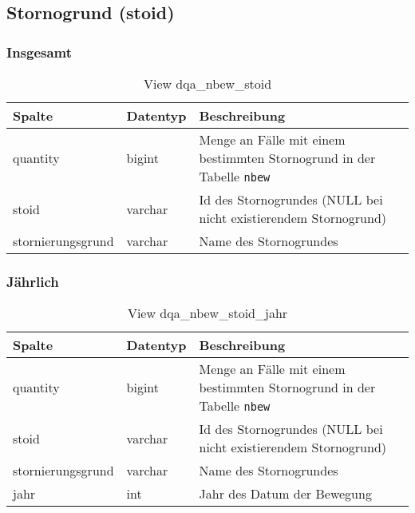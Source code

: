 \subsection{Stornogrund (stoid)} \label{subsec:bewStoid}

\subsubsection{Insgesamt} \label{subsubsec:bewStoidI}

\begin{table}[ht]
	\centering   
	\caption{View dqa\_nbew\_stoid}
	\label{tab:bewStoidI}
	\begin{tabular}{||l|l|p{10cm}||}   		
		\hline
		Spalte & Datentyp & Beschreibung \\ [0.5ex]
		\hline\hline
		quantity & bigint & Menge an Fälle mit einem bestimmten Stornogrund in der Tabelle \texttt{nbew} \\
		\hline
		stoid & varchar & Id des Stornogrundes (NULL bei nicht existierendem Stornogrund)\\
		\hline
		stornierungsgrund & varchar & Name des Stornogrundes \\
		\hline
	\end{tabular}
\end{table}

\newpage

\subsubsection{Jährlich} \label{subsubsec:bewStoidJ}

\begin{table}[ht]
	\centering   
	\caption{View dqa\_nbew\_stoid\_jahr}
	\label{tab:bewStoidJ}
	\begin{tabular}{||l|l|p{10cm}||}   		
		\hline
		Spalte & Datentyp & Beschreibung \\ [0.5ex]
		\hline\hline
		quantity & bigint & Menge an Fälle mit einem bestimmten Stornogrund in der Tabelle \texttt{nbew}\\
		\hline
		stoid & varchar & Id des Stornogrundes (NULL bei nicht existierendem Stornogrund)\\
		\hline
		stornierungsgrund & varchar & Name des Stornogrundes \\
		\hline
		jahr & int &  Jahr des Datum der Bewegung \\
		\hline		
	\end{tabular}
\end{table}

